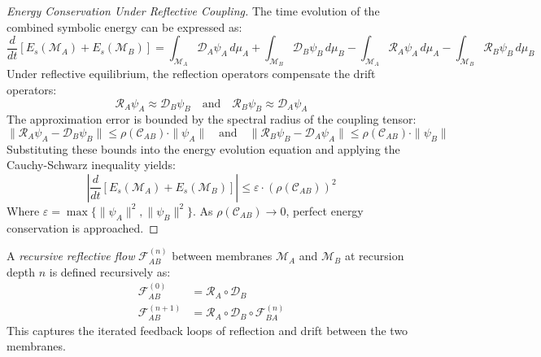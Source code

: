 \begin{proof}[Energy Conservation Under Reflective Coupling]
\label{proof:bk5_energy_conservation_under_reflective_coupling}
The time evolution of the combined symbolic energy can be expressed as:
\begin{equation}
\frac{d}{dt}[E_s(\mathscr{M}_A) + E_s(\mathscr{M}_B)] = \int_{\mathscr{M}_A} \mathscr{D}_A\psi_A\,d\mu_A + \int_{\mathscr{M}_B} \mathscr{D}_B\psi_B\,d\mu_B - \int_{\mathscr{M}_A} \mathscr{R}_A\psi_A\,d\mu_A - \int_{\mathscr{M}_B} \mathscr{R}_B\psi_B\,d\mu_B
\end{equation}
Under reflective equilibrium, the reflection operators compensate the drift operators:
\begin{equation}
\mathscr{R}_A\psi_A \approx \mathscr{D}_B\psi_B \quad \text{and} \quad \mathscr{R}_B\psi_B \approx \mathscr{D}_A\psi_A
\end{equation}
The approximation error is bounded by the spectral radius of the coupling tensor:
\begin{equation}
\|\mathscr{R}_A\psi_A - \mathscr{D}_B\psi_B\| \leq \rho(\mathcal{C}_{AB}) \cdot \|\psi_A\| \quad \text{and} \quad \|\mathscr{R}_B\psi_B - \mathscr{D}_A\psi_A\| \leq \rho(\mathcal{C}_{AB}) \cdot \|\psi_B\|
\end{equation}
Substituting these bounds into the energy evolution equation and applying the Cauchy-Schwarz inequality yields:
\begin{equation}
\left| \frac{d}{dt}[E_s(\mathscr{M}_A) + E_s(\mathscr{M}_B)] \right| \leq \varepsilon \cdot (\rho(\mathcal{C}_{AB}))^2
\end{equation}
Where $\varepsilon = \max\{\|\psi_A\|^2, \|\psi_B\|^2\}$. As $\rho(\mathcal{C}_{AB}) \to 0$, perfect energy conservation is approached.
\end{proof}
\begin{definition} \label{definition:bk5_recursive_reflective_flow}
A \emph{recursive reflective flow} $\mathcal{F}_{AB}^{(n)}$ between membranes $\mathscr{M}_A$ and $\mathscr{M}_B$ at recursion depth $n$ is defined recursively as:
\begin{align}
\mathcal{F}_{AB}^{(0)} &= \mathscr{R}_A \circ \mathscr{D}_B\\
\mathcal{F}_{AB}^{(n+1)} &= \mathscr{R}_A \circ \mathscr{D}_B \circ \mathcal{F}_{BA}^{(n)}
\end{align}
This captures the iterated feedback loops of reflection and drift between the two membranes.
\end{definition}

